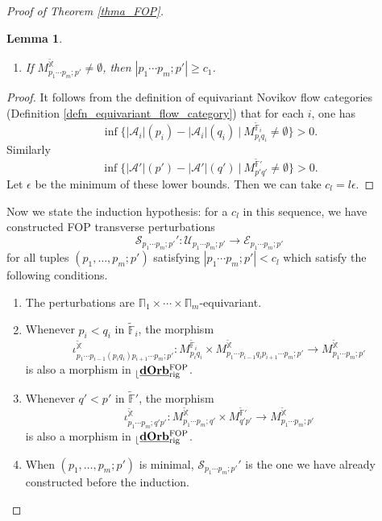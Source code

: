 \documentclass[reqno, 10pt]{amsart}
\numberwithin{equation}{section}
\numberwithin{equation}{section}
\newtheorem{lemma}[thm]{Lemma}
\theoremstyle{definition}
\theoremstyle{remark}
\newcommand{\beqn}{\begin{equation*}}
\newcommand{\eeqn}{\end{equation*}}
\newcommand{\mb}{\mathbb}
\newcommand{\mc}{\mathcal}
\renewcommand{\outer}{{}_{\lfloor}}
\newcommand{\uds}[1]{\underline{\smash{#1}}}
\begin{document}
\begin{proof}[Proof of Theorem \ref{thma_FOP}]
\begin{lemma}
\begin{enumerate}
    \item If $M_{p_1\cdots p_m; p'}^{\tilde{\mb X}} \neq \emptyset$, then $|p_1 \cdots p_m; p'| \geq c_1$. 
\end{enumerate}
\end{lemma}

\begin{proof}
It follows from the definition of equivariant Novikov flow categories (Definition \ref{defn_equivariant_flow_category}) that for each $i$, one has 
\beqn
\inf \Big\{ |{\mc A}_i| (p_i) - |{\mc A}_i|(q_i)\ |\ M_{p_iq_i}^{\tilde {\mb F}_i}\neq \emptyset \Big\} > 0.
\eeqn
Similarly
\beqn
\inf \Big\{ |{\mc A}'|(p') - |{\mc A}'|(q')  \ |\ M_{p'q'}^{\tilde {\mb F}'} \neq \emptyset \Big\} > 0.
\eeqn
Let $\epsilon$ be the minimum of these lower bounds. Then we can take $c_l = l \epsilon$. 
\end{proof}

Now we state the induction hypothesis: for a $c_l$ in this sequence, we have constructed FOP transverse perturbations
\beqn
{\mc S}_{p_1 \cdots p_m;p'}': {\mc U}_{p_1\cdots p_m; p'} \to {\mc E}_{p_1 \cdots p_m; p'}
\eeqn
for all tuples $(p_1, \ldots, p_m; p')$ satisfying $|p_1 \cdots p_m; p'| < c_l$ which satisfy the following conditions. 
\begin{enumerate}
\item The perturbations are $\mb\Pi_1 \times \cdots \times \mb\Pi_m$-equivariant. 

\item Whenever $p_i < q_i$ in $\tilde {\mb F}_i$, the morphism 
\beqn
\iota_{p_1 \cdots p_{i-1} (p_i q_i) p_{i+1} \cdots p_m; p'}^{\tilde {\mb X}}: M_{p_i q_i}^{\tilde {\mb F}_i} \times M_{p_1 \cdots p_{i-1} q_i p_{i+1} \cdots p_m; p'}^{\tilde {\mb X}} \to M_{p_1 \cdots p_m; p'}^{\tilde {\mb X}}
\eeqn
is also a morphism in $\outer \uds{\bf dOrb}_{\rm rig}^{\rm FOP}$. 

\item Whenever $q' < p'$ in $\tilde {\mb F}'$, the morphism
\beqn
\iota_{p_1 \cdots p_m; q'p'}^{\tilde {\mb X}}: M_{p_1 \cdots p_m; q'}^{\tilde {\mb X}} \times M_{q'p'}^{\tilde{\mb F}'} \to M_{p_1 \cdots p_m; p'}^{\tilde {\mb X}}
\eeqn
is also a morphism in $\outer \uds{\bf dOrb}_{\rm rig}^{\rm FOP}$. 


\item When $(p_1, \ldots, p_m; p')$ is minimal, ${\mc S}_{p_1 \cdots p_m; p'}'$ is the one we have already constructed before the induction.
\end{enumerate}


\end{proof}
\end{document}
